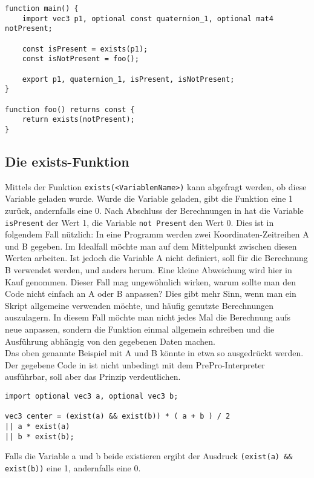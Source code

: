 \begin{lstlisting}[language=prepro, label={lst:OptionalImport}, caption={PrePro-Code mit optionalen Imports}, captionpos=b]
function main() {
	import vec3 p1, optional const quaternion_1, optional mat4 notPresent;

	const isPresent = exists(p1);
	const isNotPresent = foo();

	export p1, quaternion_1, isPresent, isNotPresent;
}

function foo() returns const {
	return exists(notPresent);
}
\end{lstlisting}

\subsection{Die exists-Funktion}
Mittels der Funktion \texttt{exists(<VariablenName>)} kann abgefragt werden, ob diese Variable geladen wurde.
Wurde die Variable geladen, gibt die Funktion eine 1 zurück, andernfalls eine 0.
Nach Abschluss der Berechnungen in  hat die Variable \texttt{isPresent} der Wert 1, die Variable \texttt{not Present} den Wert 0.
Dies ist in folgendem Fall nützlich:
In eine Programm werden zwei Koordinaten-Zeitreihen A und B gegeben.
Im Idealfall möchte man auf dem Mittelpunkt zwischen diesen Werten arbeiten.
Ist jedoch die Variable A nicht definiert, soll für die Berechnung B verwendet werden, und anders herum.
Eine kleine Abweichung wird hier in Kauf genommen.
Dieser Fall mag ungewöhnlich wirken, warum sollte man den Code nicht einfach an A oder B anpassen?
Dies gibt mehr Sinn, wenn man ein Skript allgemeine verwenden möchte, und häufig genutzte Berechnungen auszulagern.
In diesem Fall möchte man nicht jedes Mal die Berechnung aufs neue anpassen, sondern die Funktion einmal allgemein schreiben und die Ausführung abhängig von den gegebenen Daten machen.\\
Das oben genannte Beispiel mit A und B könnte in etwa so ausgedrückt werden.
Der gegebene Code in  ist nicht unbedingt mit dem PrePro-Interpreter ausführbar, soll aber das Prinzip verdeutlichen.
\begin{lstlisting}[language=prepro, label={lst:OptionalImportExample}, caption={PrePro-Code mit optionalen Imports}, captionpos=b]
import optional vec3 a, optional vec3 b;

vec3 center = (exist(a) && exist(b)) * ( a + b ) / 2
|| a * exist(a)
|| b * exist(b);
\end{lstlisting}
Falls die Variable a und b beide existieren ergibt der Ausdruck \texttt{(exist(a) \&\& exist(b))} eine 1, andernfalls eine 0.
